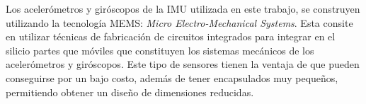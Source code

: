 Los acelerómetros y giróscopos de la IMU utilizada en este trabajo, se construyen utilizando la tecnología MEMS: \textit{Micro Electro-Mechanical Systems}. Esta consite en utilizar técnicas de fabricación de circuitos integrados para integrar en el silicio partes que móviles que constituyen los sistemas mecánicos de los acelerómetros y giróscopos. Este tipo de sensores tienen la ventaja de que pueden conseguirse por un bajo costo, además de tener encapsulados muy pequeños, permitiendo obtener un diseño de dimensiones reducidas. 












